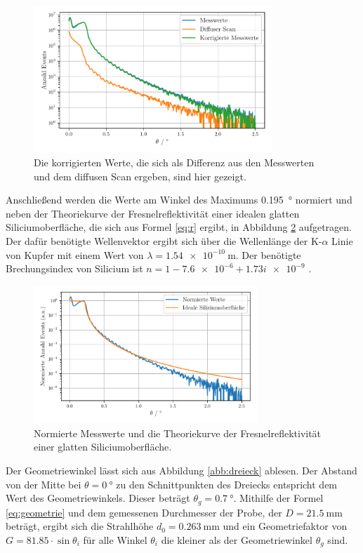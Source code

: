 \begin{figure}
    \centering
    \includegraphics[width=0.8\textwidth]{figures/messwerte_relativ.pdf}
    \caption{Die korrigierten Werte, die sich als Differenz aus den Messwerten und dem diffusen Scan ergeben, sind hier gezeigt.}
    \label{abb:diffus}
\end{figure}

Anschließend werden die Werte am Winkel des Maximums \SI{0.195}{\degree} normiert und neben der Theoriekurve der Fresnelreflektivität einer idealen glatten Siliciumoberfläche, die sich aus Formel \eqref{eq:r} ergibt, in Abbildung \ref{abb:norm} aufgetragen. Der dafür benötigte Wellenvektor ergibt sich über die Wellenlänge der K-$\alpha$ Linie von Kupfer mit einem Wert von $\lambda = \SI{1.54e-10}{\meter}$. 
Der benötigte Brechungsindex von Silicium ist $n = \num{1} - \num{7.6e-6} + \num{1.73i e-9}$ \cite{skript}.
\begin{figure}
    \centering
    \includegraphics[width=0.75\textwidth]{figures/messwerte_norm.pdf}
    \caption{Normierte Messwerte und die Theoriekurve der Fresnelreflektivität einer glatten Siliciumoberfläche.}
    \label{abb:norm}
\end{figure}

Der Geometriewinkel lässt sich aus Abbildung \ref{abb:dreieck} ablesen. 
Der Abstand von der Mitte bei $\theta = \SI{0}{\degree}$ zu den Schnittpunkten des Dreiecks entspricht dem Wert des Geometriewinkels. 
Dieser beträgt $\theta_g = \SI{0.7}{\degree}$. 
Mithilfe der Formel \eqref{eq:geometrie} und dem gemessenen Durchmesser der Probe, der $D = \SI{21.5}{\milli\metre}$ beträgt, ergibt sich die Strahlhöhe $d_0 = \SI{0.263}{\milli\meter}$ und ein Geometriefaktor von $G = \num{81.85} \cdot \sin \theta_i$ für alle Winkel $\theta_i$ die kleiner als der Geometriewinkel $\theta_g$ sind.


